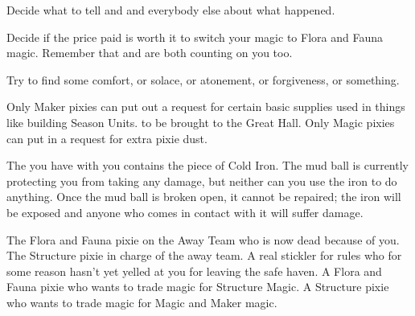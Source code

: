\documentclass[char]{PP}
\begin{document}
\begin{itemz}
	\item Decide what to tell \cSPM{} and \cELove{} and everybody else about what happened.
	\item Decide if the price paid is worth it to switch your magic to Flora and Fauna magic. Remember that \cFWanabe{} and \cSAdvisor{} are both counting on you too.
	\item Try to find some comfort, or solace, or atonement, or forgiveness, or something.
\end{itemz}

\begin{itemz}[Notes]
	\item Only Maker pixies can put out a request for certain basic supplies used in things like building Season Units. to be brought to the Great Hall. Only Magic pixies can put in a request for extra pixie dust.
	\item The \iMudCase{} you have with you contains the piece of Cold Iron. The mud ball is currently protecting you from taking any damage, but neither can you use the iron to do anything. Once the mud ball is broken open, it cannot be repaired; the iron will be exposed and anyone who comes in contact with it will suffer damage.
\end{itemz}

\begin{contacts}
	\contact{\cFLost{}} The Flora and Fauna pixie on the Away Team who is now dead because of you.
	\contact{\cSPM{}} The Structure pixie in charge of the away team. A real stickler for rules who for some reason hasn’t yet yelled at you for leaving the safe haven.
	\contact{\cFWanabe{}} A Flora and Fauna pixie who wants to trade \cFWanabe{\their} magic for Structure Magic.
	\contact{\cSAdvisor{}} A Structure pixie who wants to trade \cSAdvisor{\their} magic for Magic and Maker magic.
\end{contacts}
\end{document}

